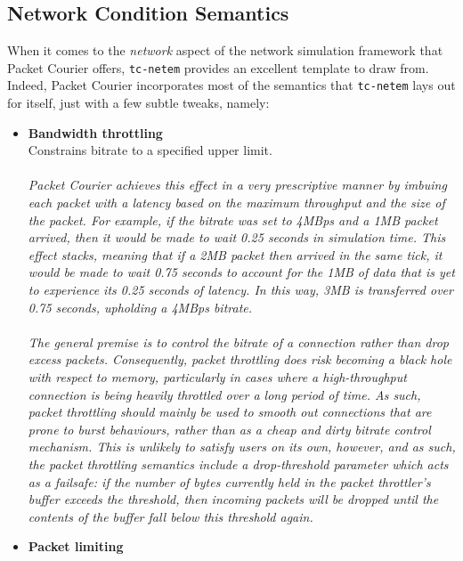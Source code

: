 \newpage

\subsection{Network Condition Semantics}

When it comes to the \emph{network} aspect of the network simulation framework that Packet Courier offers,
\texttt{tc-netem}\cite{tc_netem_wiki, tc_netem_8_man,tc_netem_src} provides an excellent template to draw from.
Indeed, Packet Courier incorporates most of the semantics that \texttt{tc-netem} lays out for itself, just with a few
subtle tweaks, namely:
\begin{itemize}
    \item \textbf{Bandwidth throttling} \\
    Constrains bitrate to a specified upper limit. \\ \\
    \emph{Packet Courier achieves this effect in a very prescriptive manner by imbuing each packet with a latency
    based on the maximum throughput and the size of the packet. For example, if the bitrate was set to 4MBps and a
    1MB packet arrived, then it would be made to wait 0.25 seconds in simulation time. This effect stacks, meaning
    that if a 2MB packet then arrived in the same tick, it would be made to wait 0.75 seconds to account for the 1MB
    of data that is yet to experience its 0.25 seconds of latency. In this way, 3MB is transferred over 0.75 seconds,
        upholding a 4MBps bitrate. \\ \\
        The general premise is to control the bitrate of a connection rather than drop excess packets. Consequently,
        packet throttling does risk becoming a black hole with respect to memory, particularly in cases where a
        high-throughput connection is being heavily throttled over a long period of time. As such, packet throttling
        should mainly be used to smooth out connections that are prone to burst behaviours, rather than as a cheap
        and dirty bitrate control mechanism. This is unlikely to satisfy users on its own, however, and as such, the
        packet throttling semantics include a drop-threshold parameter which acts as a failsafe: if the number of
        bytes currently held in the packet throttler's buffer exceeds the threshold, then incoming packets will be
        dropped until the contents of the buffer fall below this threshold again.}
    \item \textbf{Packet limiting} \\

\end{itemize}
